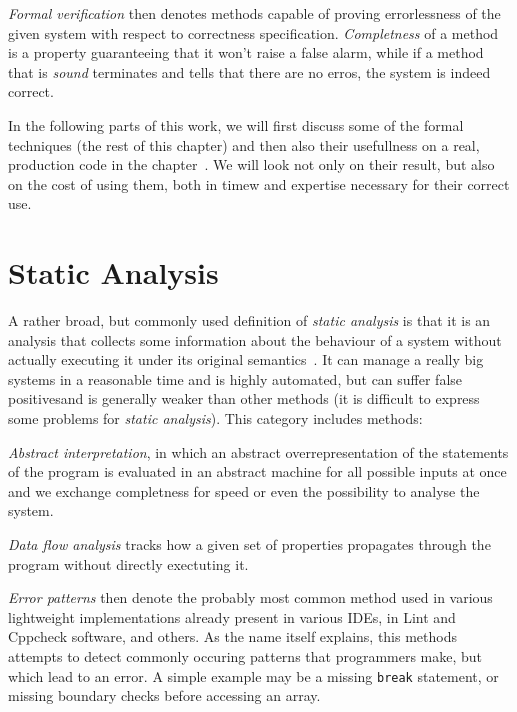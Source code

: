 {\em Formal verification} then denotes methods capable of proving errorlessness of the given system with respect to correctness specification. {\em Completness} of a method is a property guaranteeing that it won't raise a false alarm, while if a method that is {\em sound} terminates and tells that there are no erros, the system is indeed correct.

In the following parts of this work, we will first discuss some of the formal techniques (the rest of this chapter) and then also their usefullness on a real, production code in the chapter~. We will look not only on their result, but also on the cost of using them, both in timew and expertise necessary for their correct use.

\section{Static Analysis}\label{chap:fav:staticAnalysis}
A rather broad, but commonly used definition of {\em static analysis} is that it is an analysis that collects some information about the behaviour of a system without actually executing it under its original semantics~\cite[Chap. 2.2]{KrenaVojnarOverview}. It can manage a really big systems in a reasonable time and is highly automated, but can suffer false positivesand is generally weaker than other methods (it is difficult to express some problems for {\em static analysis}). This category includes methods:

{\em Abstract interpretation}, in which an abstract overrepresentation of the statements of the program is evaluated in an abstract machine for all possible inputs at once and we exchange completness for speed or even the possibility to analyse the system.

{\em Data flow analysis} tracks how a given set of properties propagates through the program without directly exectuting it.

{\em Error patterns} then denote the probably most common method used in various lightweight implementations already present in various IDEs, in Lint and Cppcheck software, and others. As the name itself explains, this methods attempts to detect commonly occuring patterns that programmers make, but which lead to an error. A simple example may be a missing {\tt break} statement, or missing boundary checks before accessing an array.


